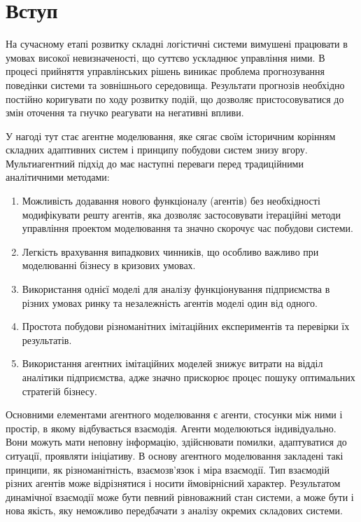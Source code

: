 \section*{Вступ}


На сучасному етапі розвитку складні логістичні системи вимушені працювати в умовах високої невизначеності, що суттєво ускладнює управління ними. 
В процесі прийняття управлінських рішень виникає проблема прогнозування поведінки системи та зовнішнього середовища. 
Результати прогнозів необхідно постійно коригувати по ходу розвитку подій, що дозволяє пристосовуватися до змін оточення та гнучко реагувати на негативні впливи. 

У нагоді тут стає агентне моделювання, яке сягає своїм історичним корінням складних адаптивних систем і принципу побудови систем знизу вгору.
Мультиагентний підхід до має наступні переваги перед традиційними аналітичними методами:
\begin{enumerate}
	\item Можливість додавання нового функціоналу (агентів) без
	необхідності модифікувати решту агентів, яка дозволяє
	застосовувати ітераційні методи управління проектом моделювання
	та значно скорочує час побудови системи.
	\item Легкість врахування випадкових чинників, що особливо важливо
	при моделюванні бізнесу в кризових умовах.
	\item Використання однієї моделі для аналізу функціонування
	підприємства в різних умовах ринку та незалежність агентів моделі
	один від одного.
	\item Простота побудови різноманітних імітаційних експериментів та
	перевірки їх результатів.
	\item Використання агентних імітаційних моделей знижує витрати на
	відділ аналітики підприємства, адже значно прискорює процес
	пошуку оптимальних стратегій бізнесу.
\end{enumerate}

Основними елементами агентного моделювання є агенти, стосунки між ними і простір, в якому відбувається взаємодія. 
Агенти моделюються індивідуально. 
Вони можуть мати неповну інформацію, здійснювати помилки, адаптуватися до ситуації, проявляти ініціативу. 
В основу агентного моделювання закладені такі принципи, як різноманітність, взаємозв’язок і міра взаємодії. 
Тип взаємодій різних агентів може відрізнятися і носити ймовірнісний характер. 
Результатом динамічної взаємодії може бути певний рівноважний стан системи, а може бути і нова якість, яку неможливо передбачати з аналізу окремих складових системи.

